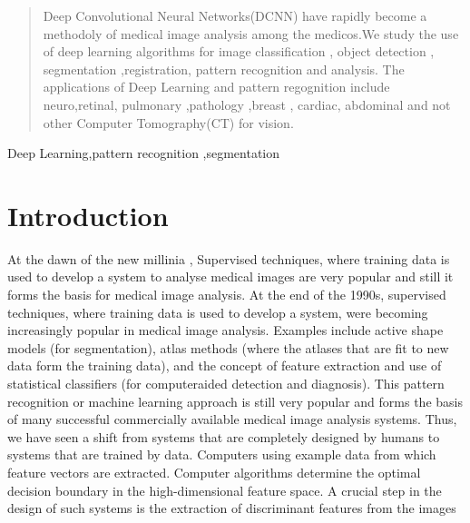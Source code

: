 \documentclass[conference]{IEEEtran}
\begin{document}
\begin{abstract}
Deep Convolutional Neural Networks(DCNN) have rapidly become a methodoly of medical image analysis among the medicos.We  study  the use of deep learning algorithms for image classification , object detection , segmentation ,registration, pattern recognition and analysis.
The applications of Deep Learning and pattern regognition include neuro,retinal, pulmonary ,pathology ,breast , cardiac, abdominal and not other Computer Tomography(CT) for vision.
\end{abstract}

\begin{IEEEkeywords}
Deep Learning,pattern recognition ,segmentation
\end{IEEEkeywords}

\section{Introduction}
At the dawn of the new millinia ,  Supervised techniques, where training data is used to develop a system  to analyse medical images are very popular and still it forms the basis for medical  image analysis.  At the end of the 1990s, supervised techniques, where training data is used to develop a system, were becoming increasingly popular in medical image analysis. Examples include active shape models (for segmentation), atlas methods (where the atlases that are fit to new data form the training data), and the concept of feature extraction and use of statistical classifiers (for computeraided detection and diagnosis). This pattern recognition or machine learning approach is still very popular and forms the basis of many successful commercially available medical image analysis systems. Thus, we have seen a shift from systems that are completely designed by humans to systems that are trained by data.
Computers using example data from which feature vectors are extracted. Computer algorithms determine the optimal decision boundary in the high-dimensional feature space. A crucial step in the design of such systems is the extraction of discriminant features from the images
\end{document}

